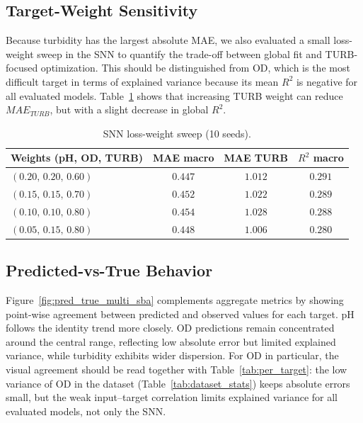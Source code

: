 \subsection{Target-Weight Sensitivity}
Because turbidity has the largest absolute MAE, we also evaluated a small loss-weight sweep in the SNN to quantify the trade-off between global fit and TURB-focused optimization. This should be distinguished from OD, which is the most difficult target in terms of explained variance because its mean $R^2$ is negative for all evaluated models. Table~\ref{tab:snn_weight_sweep_sba} shows that increasing TURB weight can reduce $MAE_{TURB}$, but with a slight decrease in global $R^2$.

\begin{table}[!htbp]
\caption{SNN loss-weight sweep (10 seeds).}
\label{tab:snn_weight_sweep_sba}
\centering
\footnotesize
\setlength{\tabcolsep}{3pt}
\begin{tabular}{lccc}
\toprule
Weights (pH, OD, TURB) & MAE macro & MAE TURB & $R^2$ macro \\
\midrule
$(0.20,\,0.20,\,0.60)$ & $\mathbf{0.447}$ & $1.012$ & $\mathbf{0.291}$ \\
$(0.15,\,0.15,\,0.70)$ & $0.452$ & $1.022$ & $0.289$ \\
$(0.10,\,0.10,\,0.80)$ & $0.454$ & $1.028$ & $0.288$ \\
$(0.05,\,0.15,\,0.80)$ & $0.448$ & $\mathbf{1.006}$ & $0.280$ \\
\bottomrule
\end{tabular}
\end{table}

\subsection{Predicted-vs-True Behavior}
Figure~\ref{fig:pred_true_multi_sba} complements aggregate metrics by showing point-wise agreement between predicted and observed values for each target. pH follows the identity trend more closely. OD predictions remain concentrated around the central range, reflecting low absolute error but limited explained variance, while turbidity exhibits wider dispersion. For OD in particular, the visual agreement should be read together with Table~\ref{tab:per_target}: the low variance of OD in the dataset (Table~\ref{tab:dataset_stats}) keeps absolute errors small, but the weak input--target correlation limits explained variance for all evaluated models, not only the SNN.

